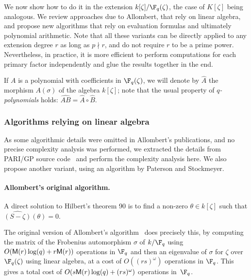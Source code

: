 We now show how to do it in the extension $k[\zeta]/\F_q(\zeta)$, the
case of $K[\zeta]$ being analogous. We review approaches due to
Allombert, that rely on linear algebra, and propose new algorithms
that rely on evaluation formulas and ultimately polynomial
arithmetic. Note that all these variants can be directly applied to
any extension degree $r$ as long as $p \nmid r$, and do not require $r$
to be a prime power.  Nevertheless, in practice, it is more efficient
to perform computations for each primary factor independently and glue
the results together in the end.

If $A$ is a polynomial with coefficients in $\F_q(\zeta)$, we will
denote by $\hat{A}$ the morphism $A(\sigma)$ of the algebra
$k[\zeta]$; note that the usual property of \emph{$q$-polynomials}
holds: $\widehat{AB} = \hat{A}\circ\hat{B}$.

\subsubsection{Algorithms relying on linear algebra}
\label{sec:algor-rely-line}

As some algorithmic details were omitted in Allombert's publications,
and no precise complexity analysis was performed, we extracted the
details from PARI/GP source code~\cite{Pari} and perform the complexity analysis
here.  We also propose another variant, using an algorithm by Paterson
and Stockmeyer.

\paragraph{\bf Allombert's original algorithm.}
A direct solution to Hilbert's theorem 90 is to find a non-zero
$\theta\in k[\zeta]$ such that $\widehat{(S-\zeta)}(\theta)=0$.

The original version of Allombert's algorithm~\cite{Allombert02} does
precisely this, by computing the matrix of the Frobenius automorphism
$\sigma$ of $k/\F_q$ using $O(\mathsf{M}(r) \log(q) + r \mathsf{M}(r))$ operations
in $\F_q$ and then an eigenvalue of $\sigma$ for $\zeta$ over
$\F_q(\zeta)$ using linear algebra, at a cost of $O((rs)^\omega)$
operations in $\F_q$. This gives a total cost of $O(s \mathsf{M}(r) \log(q) +
(rs)^{\omega})$ operations in~$\F_q$.

